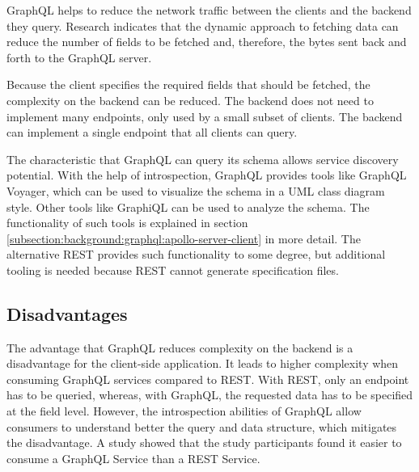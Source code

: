 GraphQL helps to reduce the network traffic between the clients and the backend they query. Research indicates that the dynamic approach to fetching data can reduce the number of fields to be fetched and, therefore, the bytes sent back and forth to the GraphQL server. \cite{inprocessdings:2019:background:graphql:migration-to-graphql}

\bigskip

\noindent Because the client specifies the required fields that should be fetched, the complexity on the backend can be reduced. The backend does not need to implement many endpoints, only used by a small subset of clients. The backend can implement a single endpoint that all clients can query. \cite{book:2018:richardson:background:bff:microservices-patterns}

\bigskip

\noindent The characteristic that GraphQL can query its schema allows service discovery potential. With the help of introspection, GraphQL provides tools like GraphQL Voyager, which can be used to visualize the schema in a UML class diagram style. Other tools like GraphiQL can be used to analyze the schema. The functionality of such tools is explained in section \ref{subsection:background:graphql:apollo-server-client} in more detail. The alternative REST provides such functionality to some degree, but additional tooling is needed because REST cannot generate specification files.


\subsection{Disadvantages}\label{subsection:background:graphql:graphql-disadvantages}

\noindent The advantage that GraphQL reduces complexity on the backend is a disadvantage for the client-side application. It leads to higher complexity when consuming GraphQL services compared to REST. With REST, only an endpoint has to be queried, whereas, with GraphQL, the requested data has to be specified at the field level. However, the introspection abilities of GraphQL allow consumers to understand better the query and data structure, which mitigates the disadvantage. A study \cite{inproceedings:2020:brito:background:graphql:rest-vs-graphql} showed that the study participants found it easier to consume a GraphQL Service than a REST Service.


